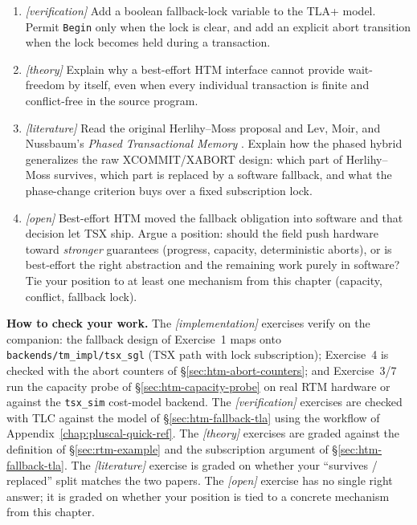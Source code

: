 \begin{enumerate}
    \item \emph{[verification]} Add a boolean fallback-lock variable to the TLA+ model. Permit \texttt{Begin} only when the lock is clear, and add an explicit abort transition when the lock becomes held during a transaction.
    \item \emph{[theory]} Explain why a best-effort HTM interface cannot provide wait-freedom by itself, even when every individual transaction is finite and conflict-free in the source program.
    \item \emph{[literature]} Read the original Herlihy--Moss proposal
          \cite{herlihy93} and Lev, Moir, and Nussbaum's
          \emph{Phased Transactional Memory} \cite{lev07phased}.  Explain
          how the phased hybrid generalizes the raw XCOMMIT/XABORT design:
          which part of Herlihy--Moss survives, which part is replaced by
          a software fallback, and what the phase-change criterion buys
          over a fixed subscription lock.
    \item \emph{[open]} Best-effort HTM moved the fallback obligation into
          software and that decision let TSX ship.  Argue a position:
          should the field push hardware toward \emph{stronger} guarantees
          (progress, capacity, deterministic aborts), or is best-effort
          the right abstraction and the remaining work purely in software?
          Tie your position to at least one mechanism from this chapter
          (capacity, conflict, fallback lock).
\end{enumerate}

\textbf{How to check your work.} The \emph{[implementation]} exercises
verify on the companion: the fallback design of Exercise~1 maps onto
\texttt{backends/tm\_impl/tsx\_sgl} (TSX path with lock subscription);
Exercise~4 is checked with the abort counters of
\S\ref{sec:htm-abort-counters}; and Exercise~3/7 run the capacity probe of
\S\ref{sec:htm-capacity-probe} on real RTM hardware or against the
\texttt{tsx\_sim} cost-model backend.  The \emph{[verification]} exercises are
checked with TLC against the model of \S\ref{sec:htm-fallback-tla} using
the workflow of Appendix~\ref{chap:pluscal-quick-ref}.  The
\emph{[theory]} exercises are graded against the definition of
\S\ref{sec:rtm-example} and the subscription argument of
\S\ref{sec:htm-fallback-tla}.  The \emph{[literature]} exercise is graded
on whether your ``survives / replaced'' split matches the two papers.  The
\emph{[open]} exercise has no single right answer; it is graded on whether
your position is tied to a concrete mechanism from this chapter.

